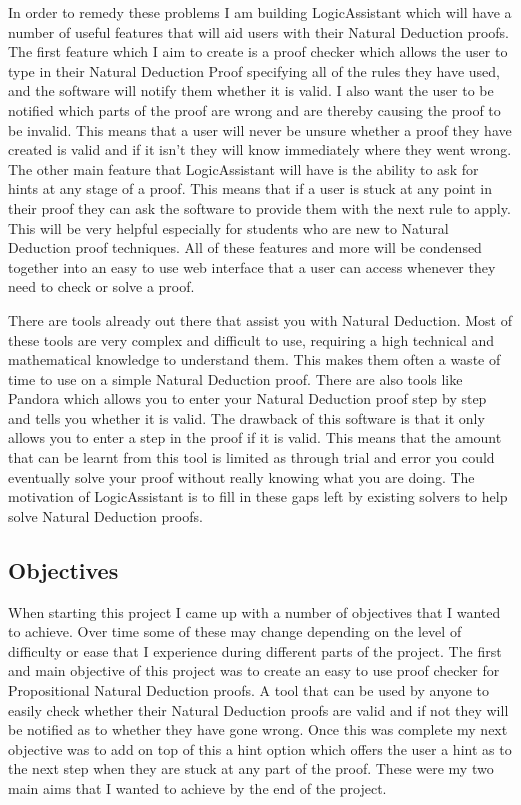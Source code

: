 In order to remedy these problems I am building LogicAssistant which will have a number of useful features that will aid users with their Natural Deduction proofs. The first feature which I aim to create is a proof checker which allows the user to type in their Natural Deduction Proof specifying all of the rules they have used, and the software will notify them whether it is valid. I also want the user to be notified which parts of the proof are wrong and are thereby causing the proof to be invalid. This means that a user will never be unsure whether a proof they have created is valid and if it isn't they will know immediately where they went wrong. The other main feature that LogicAssistant will have is the ability to ask for hints at any stage of a proof. This means that if a user is stuck at any point in their proof they can ask the software to provide them with the next rule to apply. This will be very helpful especially for students who are new to Natural Deduction proof techniques. All of these features and more will be condensed together into an easy to use web interface that a user can access whenever they need to check or solve a proof. 

There are tools already out there that assist you with Natural Deduction. Most of these tools are very complex and difficult to use, requiring a high technical and mathematical knowledge to understand them. This makes them often a waste of time to use on a simple Natural Deduction proof. There are also tools like Pandora\cite{pandora} which allows you to enter your Natural Deduction proof step by step and tells you whether it is valid. The drawback of this software is that it only allows you to enter a step in the proof if it is valid. This means that the amount that can be learnt from this tool is limited as through trial and error you could eventually solve your proof without really knowing what you are doing. The motivation of LogicAssistant is to fill in these gaps left by existing solvers to help solve Natural Deduction proofs.

\subsection{Objectives}

When starting this project I came up with a number of objectives that I wanted to achieve. Over time some of these may change depending on the level of difficulty or ease that I experience during different parts of the project. The first and main objective of this project was to create an easy to use proof checker for Propositional Natural Deduction proofs. A tool that can be used by anyone to easily check whether their Natural Deduction proofs are valid and if not they will be notified as to whether they have gone wrong. Once this was complete my next objective was to add on top of this a hint option which offers the user a hint as to the next step when they are stuck at any part of the proof. These were my two main aims that I wanted to achieve by the end of the project.

